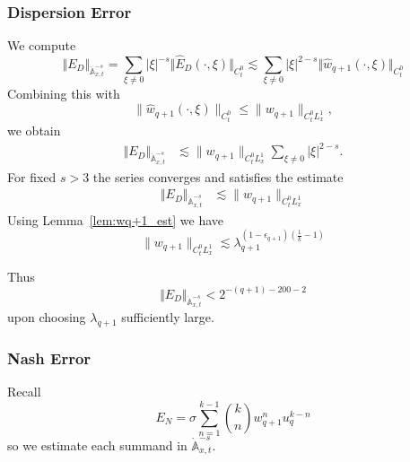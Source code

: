 \documentclass[12pt,reqno,letterpaper]{amsart}
\numberwithin{equation}{section}
\newcommand{\1}{{\bf 1}}
\newcommand{\2}{{\bf 2}}
\newcommand{\T}{\mathbb T}
\newcommand{\Z}{\mathbb Z}
\newcommand{\norm}[1]{ \Vert #1 \Vert}
\theoremstyle{remark}
\theoremstyle{remark}
\begin{document}
\subsubsection*{Dispersion Error}
We compute
\begin{equation*}
    \norm{E_D}_{\dot{\mathbb{A}}_{x,t}^{-s}} = \sum_{\xi \neq 0}|\xi|^{-s} \norm{\hat{E}_D(\cdot,\xi)}_{C_t^0} \lesssim \sum_{\xi \neq 0} |\xi|^{2 - s} \norm{\hat{w}_{q+1}(\cdot, \xi)}_{C_t^0}
\end{equation*}
Combining this with 
$$
\|\hat{w}_{q+1}(\cdot,\xi)\|_{C_t^0}\le \|w_{q+1}\|_{C_t^0L_x^1},
$$
we obtain
\begin{align*}
   \norm{E_D}_{\dot{\mathbb{A}}_{x,t}^{-s}}
&\lesssim
\|w_{q+1}\|_{C_t^0L_x^1}
\sum_{\xi \not=0} |\xi|^{2-s}.
\end{align*}
For fixed $s >3$ the series converges and satisfies the estimate
\begin{align*}
  \norm{E_D}_{\dot{\mathbb{A}}_{x,t}^{-s}}
&\lesssim\|w_{q+1}\|_{C_t^0L_x^1}
\end{align*}
Using Lemma~\ref{lem:wq+1_est} we have
\[\|w_{q+1}\|_{C_t^0L_x^1} \lesssim \lambda_{q+1}^{(1 - \epsilon_{q+1})(\frac{1}{k} - 1)} \] 

Thus 
\begin{equation}\label{eq:ED-decay}
   \norm{E_D}_{\dot{\mathbb{A}}_{x,t}^{-s}}
    < 2^{-(q+1) - 200 - 2}
\end{equation}
upon choosing $\lambda_{q+1}$ sufficiently large.

\subsubsection*{Nash Error}
Recall 
\[  E_N = \sigma \sum_{n=1}^{k-1} \binom{k}{n} w_{q+1}^n u_q^{k-n}\]
so we estimate each summand in $\dot{\mathbb{A}}_{x,t}^{-s}$. 
\end{document}
